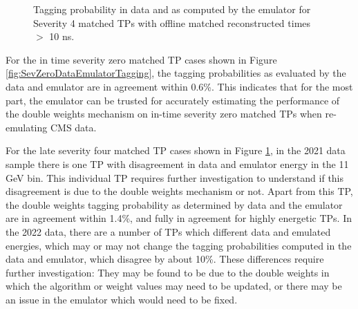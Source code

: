 \begin{figure}[H]%
    \setcounter{subfigure}{0}
    \centering
    \hfill
    \caption{Tagging probability in data and as computed by the emulator for Severity 4 matched TPs with offline matched reconstructed times $>$ 10 ns. \label{fig:SevFourDataEmulatorTagging}}%
\end{figure}  

For the in time severity zero matched TP cases shown in Figure \ref{fig:SevZeroDataEmulatorTagging}, the tagging probabilities as evaluated by the data and emulator are in agreement within 0.6\%. This indicates that for the most part, the emulator can be trusted for accurately estimating the performance of the double weights mechanism on in-time severity zero matched TPs when re-emulating CMS data. 

For the late severity four matched TP cases shown in Figure \ref{fig:SevFourDataEmulatorTagging}, in the 2021 data sample there is one TP with disagreement in data and emulator energy in the 11 GeV bin. This individual TP requires further investigation to understand if this disagreement is due to the double weights mechanism or not. Apart from this TP, the double weights tagging probability as determined by data and the emulator are in agreement within 1.4\%, and fully in agreement for highly energetic TPs. In the 2022 data, there are a number of TPs which different data and emulated energies, which may or may not change the tagging probabilities computed in the data and emulator, which disagree by about 10\%. These differences require further investigation: They may be found to be due to the double weights in which the algorithm or weight values may need to be updated, or there may be an issue in the emulator which would need to be fixed.

